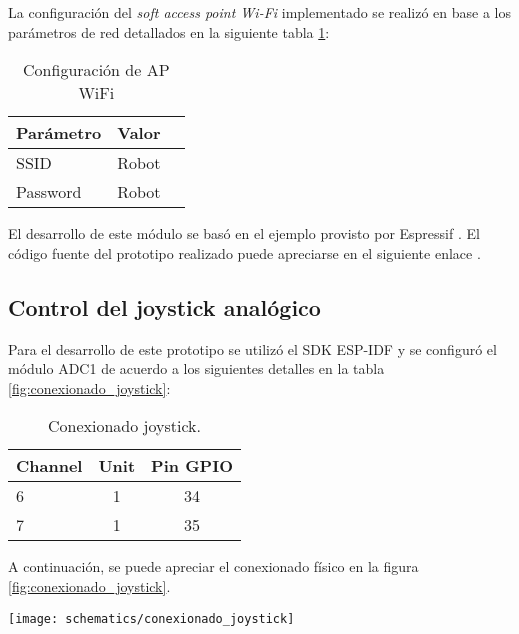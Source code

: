 La configuración del \textit{soft access point Wi-Fi} implementado se realizó en base a los parámetros de red detallados en la siguiente tabla  \ref{tab:configuracion_wifi}:

\vspace{0.5cm}
\begin{table}[h]
\centering
\caption[Configuración de AP WiFi]{Configuración de AP WiFi}
\begin{tabular}{l c c}
\toprule
\textbf{Parámetro} & \textbf{Valor} \\
\midrule
SSID & Robot  \\
Password & Robot  \\
\bottomrule
\hline
\end{tabular}
\label{tab:configuracion_wifi}
\end{table}


El desarrollo de este módulo se basó en el ejemplo provisto por Espressif \cite{ESP32_WiFi_SoftAP}. El código fuente del prototipo realizado puede apreciarse en el siguiente enlace \cite{ESP32_POC_WiFi}.


\subsection{Control del joystick analógico}
Para el desarrollo de este prototipo se utilizó el SDK ESP-IDF y se configuró el módulo ADC1 de acuerdo a los siguientes detalles en la tabla \ref{fig:conexionado_joystick}:

\vspace{0.5cm}
\begin{table}[h]
\centering
\caption[Conexionado joystick]{Conexionado joystick.}
\begin{tabular}{l c c}
\toprule
\textbf{Channel} & \textbf{Unit} & \textbf{Pin GPIO}\\
\midrule
6 & 1 & 34 \\
7 & 1 & 35 \\
\bottomrule
\hline
\end{tabular}
\label{tab:conexionado_joystick}
\end{table}

A continuación, se puede apreciar el conexionado físico en la figura \ref{fig:conexionado_joystick}.

\begin{center}
\texttt{[image: schematics/conexionado\_joystick]}
  \label{fig:conexionado_joystick}
\end{center}


